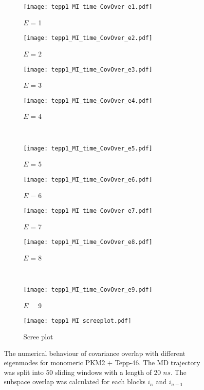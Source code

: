 \documentclass[11pt]{article}
\begin{document}
\begin{figure}[hbt]
\centering
\begin{subfigure}[b]{.24\linewidth}
    \centering
    \texttt{[image: tepp1\_MI\_time\_CovOver\_e1.pdf]}
    \caption{$E$ = 1}\label{fig:2a}
  \end{subfigure}%
  \begin{subfigure}[b]{.24\linewidth}
    \centering
    \texttt{[image: tepp1\_MI\_time\_CovOver\_e2.pdf]}
    \caption{$E$ = 2}\label{fig:2b}
  \end{subfigure}%
  \begin{subfigure}[b]{.24\linewidth}
    \centering
    \texttt{[image: tepp1\_MI\_time\_CovOver\_e3.pdf]}
    \caption{$E$ = 3}\label{fig:2c}
  \end{subfigure}%
  \begin{subfigure}[b]{.24\linewidth}
    \centering
    \texttt{[image: tepp1\_MI\_time\_CovOver\_e4.pdf]}
    \caption{$E$ = 4}\label{fig:2d}
  \end{subfigure}\\%
  \begin{subfigure}[b]{.24\linewidth}
    \centering
    \texttt{[image: tepp1\_MI\_time\_CovOver\_e5.pdf]}
    \caption{$E$ = 5}\label{fig:2e}
  \end{subfigure}%
  \begin{subfigure}[b]{.24\linewidth}
    \centering
    \texttt{[image: tepp1\_MI\_time\_CovOver\_e6.pdf]}
    \caption{$E$ = 6}\label{fig:2f}
  \end{subfigure}%
  \begin{subfigure}[b]{.24\linewidth}
    \centering
    \texttt{[image: tepp1\_MI\_time\_CovOver\_e7.pdf]}
    \caption{$E$ = 7}\label{fig:2g}
  \end{subfigure}%
  \begin{subfigure}[b]{.24\linewidth}
    \centering
    \texttt{[image: tepp1\_MI\_time\_CovOver\_e8.pdf]}
    \caption{$E$ = 8}\label{fig:2h}
  \end{subfigure}\\%
  \begin{subfigure}[b]{.24\linewidth}
    \centering
    \texttt{[image: tepp1\_MI\_time\_CovOver\_e9.pdf]}
    \caption{$E$ = 9}\label{fig:2i}
  \end{subfigure}%
  \begin{subfigure}[b]{.24\linewidth}
    \centering
    \texttt{[image: tepp1\_MI\_screeplot.pdf]}
    \caption{Scree plot}\label{fig:2j}
  \end{subfigure}%
\caption{The numerical behaviour of covariance overlap with different eigenmodes for monomeric PKM2 + Tepp-46. The MD trajectory was split into 50 sliding windows with a length of 20 $ns$. The subspace overlap was calculated for each blocks $i_{n}$ and $i_{n-1}$}\label{fig:2}
\end{figure}
\end{document}
